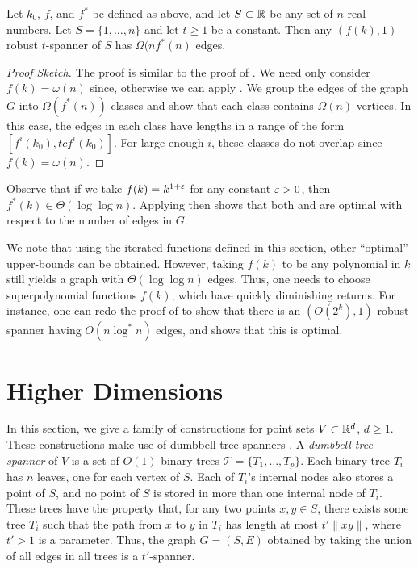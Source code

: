 \documentclass{patmorin}
\begin{document}
\begin{thm}
Let $k_0$, $f$, and $f^*$ be defined as above, and let $S\subset \mathbb{R}$
be any set of $n$ real numbers.  Let $S=\{1,\ldots,n\}$ and let $t\ge
1$ be a constant.  Then any $(f(k),1)$-robust $t$-spanner of $S$ has
$\Omega(nf^*(n)$ edges.
\end{thm}

\begin{proof}[Proof Sketch]
The proof is similar to the proof of .
We need only consider $f(k)=\omega(n)$ since, otherwise we can apply
.  We group the edges of the graph $G$ into
$\Omega(f^*(n))$ classes and show that each class contains $\Omega(n)$
vertices.  In this case, the edges in each class have lengths in a
range of the form $[f^i(k_0),tcf^{i}(k_0)]$.  For large enough $i$,
these classes do not overlap since $f(k)=\omega(n)$.
\end{proof}

\begin{rem}
Observe that if we take $f(k)=k^{1+\varepsilon}$ for any constant $\varepsilon >0$, then
$f^*(k) \in \Theta(\log\log n)$.  Applying 
then shows that both  and 
are optimal with respect to the number of edges in $G$.
\end{rem}

\begin{rem}
We note that using the iterated functions defined in this section, other
``optimal'' upper-bounds can be obtained.  However, taking $f(k)$ to
be any polynomial in $k$ still yields a graph with $\Theta(\log\log n)$
edges.  Thus, one needs to choose superpolynomial functions $f(k)$, which
have quickly diminishing returns.  For instance, one can redo the proof
of  to show that there is an $(O(2^k),1)$-robust
spanner having $O(n\log^* n)$ edges, and 
shows that this is optimal.
\end{rem}



\section{Higher Dimensions}

In this section, we give a family of constructions for point sets
$V\subset\mathbb{R}^d$, $d\ge 1$.  These constructions make use of dumbbell
tree spanners \cite{X}.  A \emph{dumbbell tree spanner} of $V$ is a set
of $O(1)$ binary trees $\mathcal{T}=\{T_1,\ldots,T_p\}$.  Each binary
tree $T_i$ has $n$ leaves, one for each vertex of $S$.  Each of $T_i$'s
internal nodes also stores a point of $S$, and no point of $S$ is stored
in more than one internal node of $T_i$.  These trees have the property
that, for any two points $x,y\in S$, there exists some tree $T_i$ such
that the path from $x$ to $y$ in $T_i$ has length at most $t'\|xy\|$,
where $t'>1$ is a parameter.  Thus, the graph $G=(S,E)$ obtained by
taking the union of all edges in all trees is a $t'$-spanner.
\end{document}
